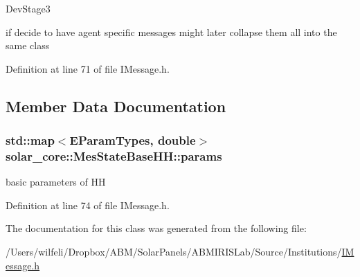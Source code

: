 \begin{DoxyRefDesc}{Dev\+Stage3}
\item[\hyperlink{_dev_stage3__DevStage3000004}{Dev\+Stage3}]if decide to have agent specific messages might later collapse them all into the same class\end{DoxyRefDesc}


Definition at line 71 of file I\+Message.\+h.



\subsection{Member Data Documentation}
\hypertarget{classsolar__core_1_1_mes_state_base_h_h_a75575469dfbf7a86bd1ea95fb85c5194}{}
\subsubsection[{params}]{\setlength{\rightskip}{0pt plus 5cm}std\+::map$<${\bf E\+Param\+Types}, double$>$ solar\+\_\+core\+::\+Mes\+State\+Base\+H\+H\+::params}\label{classsolar__core_1_1_mes_state_base_h_h_a75575469dfbf7a86bd1ea95fb85c5194}
basic parameters of H\+H 

Definition at line 74 of file I\+Message.\+h.



The documentation for this class was generated from the following file\+:\begin{DoxyCompactItemize}
\item 
/\+Users/wilfeli/\+Dropbox/\+A\+B\+M/\+Solar\+Panels/\+A\+B\+M\+I\+R\+I\+S\+Lab/\+Source/\+Institutions/\hyperlink{_i_message_8h}{I\+Message.\+h}\end{DoxyCompactItemize}
